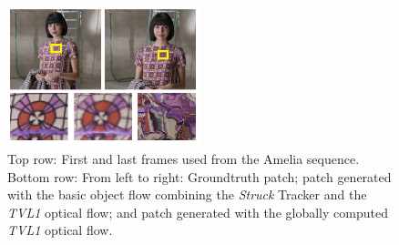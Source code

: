    \begin{figure}[thpb]
      \centering
      \includegraphics[width=0.5\textwidth]{../images/objectflow_nosegm.png}
      \caption{Top row: First and last frames used from the Amelia sequence. Bottom row: From left to right: Groundtruth patch; patch generated with the 
basic object flow combining the {\it Struck} Tracker and the {\it TVL1} optical flow; and patch generated with the globally computed  {\it TVL1} optical flow.}
      \label{of_nose}
   \end{figure}

